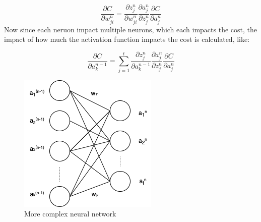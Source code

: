 $$
\frac{\partial C}{\partial w_{ji}^n} =\frac{\partial z_j^n}{\partial w_{ji}^n}\frac{\partial a_j^n}{\partial z_j^n}\frac{\partial C}{  \partial a_j^n}
$$
Now since each neruon impact multiple neurons, which each impacts the cost, the impact of how much the activation function impacts the cost is calculated, like:

$$
\frac{\partial C}{\partial a^{n-1}_k} = \sum^t_{j=1} \frac{\partial z_j^n}{\partial a_k^{n-1}}\frac{\partial a_j^n}{\partial z_j^n}\frac{\partial C}{  \partial a_j^n}
$$

\begin{figure}[!ht]
  \centering
  \includegraphics[scale=0.4]{latex/imgs/multibackprop.png}
  \caption{More complex neural network}\label{Baseline:before}
\end{figure}